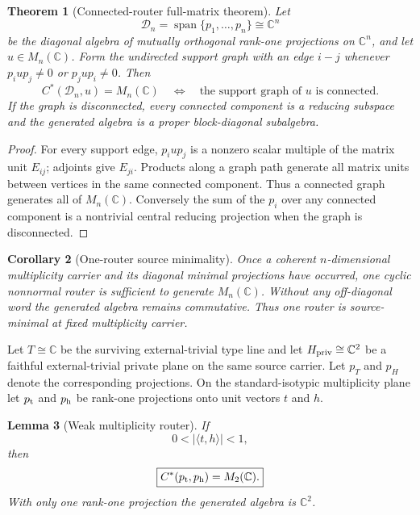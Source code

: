\documentclass[11pt]{article}
\newtheorem{theorem}{Theorem}[section]
\newtheorem{lemma}[theorem]{Lemma}
\newtheorem{corollary}[theorem]{Corollary}
\theoremstyle{definition}
\theoremstyle{remark}
\newcommand{\C}{\mathbb C}
\newcommand{\Span}{\operatorname{span}}
\newcommand{\abs}[1]{\lvert#1\rvert}
\begin{document}
\begin{theorem}[Connected-router full-matrix theorem]
\label{thm:connected-router}
Let
\[
\mathcal D_n=\Span\{p_1,\ldots,p_n\}\cong\C^n
\]
be the diagonal algebra of mutually orthogonal rank-one projections on
$\C^n$, and let $u\in M_n(\C)$.  Form the undirected support graph with an
edge $i-j$ whenever $p_iup_j\ne0$ or $p_jup_i\ne0$.  Then
\begin{equation}
\boxed{
C^*(\mathcal D_n,u)=M_n(\C)
\quad\Longleftrightarrow\quad
\text{the support graph of $u$ is connected}.}
\label{eq:router-full-matrix}
\end{equation}
If the graph is disconnected, every connected component is a reducing
subspace and the generated algebra is a proper block-diagonal subalgebra.
\end{theorem}

\begin{proof}
For every support edge, $p_iup_j$ is a nonzero scalar multiple of the matrix
unit $E_{ij}$; adjoints give $E_{ji}$.  Products along a graph path generate
all matrix units between vertices in the same connected component.  Thus a
connected graph generates all of $M_n(\C)$.  Conversely the sum of the
$p_i$ over any connected component is a nontrivial central reducing
projection when the graph is disconnected.
\end{proof}

\begin{corollary}[One-router source minimality]
\label{cor:one-router-minimality}
Once a coherent $n$-dimensional multiplicity carrier and its diagonal minimal
projections have occurred, one cyclic nonnormal router is sufficient to
generate $M_n(\C)$.  Without any off-diagonal word the generated algebra
remains commutative.  Thus one router is source-minimal at fixed multiplicity
carrier.
\end{corollary}

Let $T\cong\C$ be the surviving external-trivial type line and let
$H_{\rm priv}\cong\C^2$ be a faithful external-trivial private plane on the
same source carrier.  Let $p_T$ and $p_H$ denote the corresponding
projections.  On the standard-isotypic multiplicity plane let $p_{\rm t}$ and
$p_{\rm h}$ be rank-one projections onto unit vectors $t$ and $h$.

\begin{lemma}[Weak multiplicity router]
\label{lem:weak-M2}
If
\begin{equation}
0<\abs{\langle t,h\rangle}<1,
\label{eq:weak-overlap}
\end{equation}
then
\begin{equation}
\boxed{C^*(p_{\rm t},p_{\rm h})=M_2(\C).}
\label{eq:weak-M2}
\end{equation}
With only one rank-one projection the generated algebra is $\C^2$.
\end{lemma}
\end{document}
